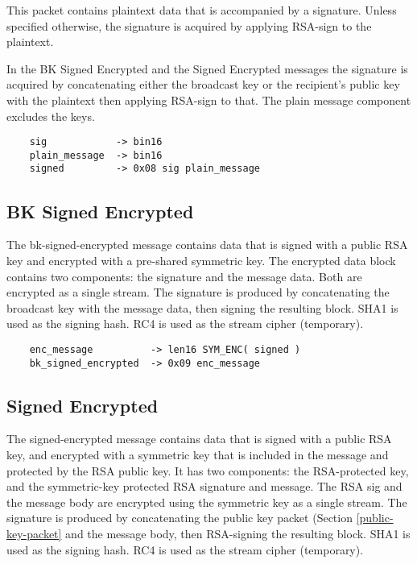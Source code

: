 \documentclass[letterpaper,11pt,oneside]{article}
\begin{document}
This packet contains plaintext data that is accompanied by a signature. Unless
specified otherwise, the signature is acquired by applying RSA-sign to the
plaintext. 

In the BK Signed Encrypted and the Signed Encrypted messages the
signature is acquired by concatenating either the broadcast key or the
recipient's public key with the plaintext then applying RSA-sign to that. The
plain message component excludes the keys.

\vspace{10pt}
\begin{verbatim}
    sig            -> bin16
    plain_message  -> bin16
    signed         -> 0x08 sig plain_message
\end{verbatim}
\vspace{10pt}

\subsection{BK Signed Encrypted}

The bk-signed-encrypted message contains data that is signed with a public RSA
key and encrypted with a pre-shared symmetric key. The encrypted data block
contains two components: the signature and the message data. Both are encrypted
as a single stream. The signature is produced by concatenating the broadcast
key with the message data, then signing the resulting block. SHA1 is used as
the signing hash. RC4 is used as the stream cipher (temporary).

\vspace{10pt}
\begin{verbatim}
    enc_message          -> len16 SYM_ENC( signed ) 
    bk_signed_encrypted  -> 0x09 enc_message
\end{verbatim}
\vspace{10pt}

\subsection{Signed Encrypted}

The signed-encrypted message contains data that is signed with a public RSA
key, and encrypted with a symmetric key that is included in the message and
protected by the RSA public key. It has two components: the RSA-protected key,
and the symmetric-key protected RSA signature and message. The RSA sig and the
message body are encrypted using the symmetric key as a single stream. The
signature is produced by concatenating the public key packet (Section
\ref{public-key-packet} and the message body, then RSA-signing the resulting
block. SHA1 is used as the signing hash. RC4 is used as the stream cipher
(temporary).
\end{document}
